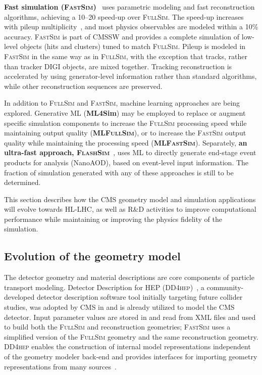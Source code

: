 \textbf{Fast simulation (\textsc{FastSim})}~\cite{Sekmen:2016iql} uses parametric modeling and fast reconstruction algorithms, achieving a 10--20 speed-up over \textsc{FullSim}. The speed-up increases with pileup multiplicity~\cite{CMS-DP-2023-063}, and most physics observables are modeled within a 10\% accuracy.
\textsc{FastSim} is part of \gls{CMSSW} and provides a complete simulation of low-level objects (hits and clusters) tuned to match \textsc{FullSim}. Pileup is modeled in \textsc{FastSim} in the same way as in \textsc{FullSim}, with the exception that tracks, rather than tracker \gls{DIGI} objects, are mixed together.
Tracking reconstruction is accelerated by using generator-level information rather than standard algorithms, while other reconstruction sequences are preserved.

In addition to \textsc{FullSim} and \textsc{FastSim}, machine learning approaches are being explored. Generative \gls{ML} (\textbf{ML4Sim}) may be employed to replace or augment specific simulation components to increase the \textsc{FullSim} processing speed while maintaining output quality (\textbf{\textsc{MLFullSim}}), or to increase the \textsc{FastSim} output quality while maintaining the processing speed (\textbf{\textsc{MLFastSim}}). Separately, \textbf{an ultra-fast approach, \textsc{FlashSim}}~\cite{Vaselli:2024hml}, uses \gls{ML} to directly generate end-stage event products for analysis (NanoAOD), based on event-level input information. The fraction of \PhaseTwo simulation generated with any of these approaches is still to be determined.

This section describes how the CMS geometry model and simulation applications will evolve towards \gls{HL-LHC}, as well as R\&D activities to improve computational performance while maintaining or improving the physics fidelity of the simulation.

\subsection{Evolution of the geometry model}

The detector geometry and material descriptions are core components of particle transport modeling. Detector Description for \gls{HEP} (\textsc{DD4hep})~\cite{Gaede:2020tui}, a community-developed detector description software tool initially targeting future collider studies, was adopted by CMS in \RunThree and is already utilized to model the \PhaseTwo CMS detector. Input parameter values are stored in and read from \gls{XML} files and used to build both the \textsc{FullSim} and reconstruction geometries; \textsc{FastSim} uses a simplified version of the \textsc{FullSim} geometry and the same reconstruction geometry. \textsc{DD4hep} enables the construction of internal model representations independent of the geometry modeler back-end and provides interfaces for importing geometry representations from many sources~\cite{Vuosalo:2020bwn, CMS:2021dly}.

